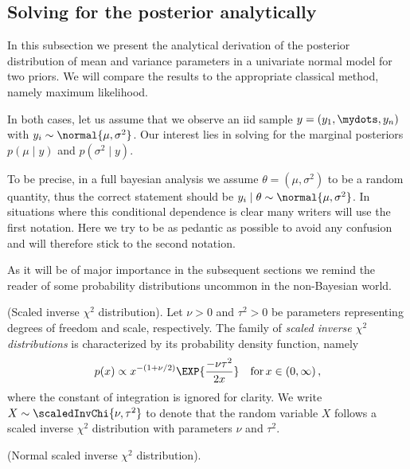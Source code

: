 \subsection{Solving for the posterior analytically}
In this subsection we present the analytical derivation of the posterior distribution of mean and variance parameters in a univariate normal model for two priors.
We will compare the results to the appropriate classical method, namely maximum likelihood.

In both cases, let us assume that we observe an iid sample $y = (y_1, \mydots, y_n)$
with $y_i \sim \normal{\mu, \sigma^2}$.
Our interest lies in solving for the marginal posteriors $p(\mu \mid y)$ and $p(\sigma^2 \mid y)$.

To be precise, in a full bayesian analysis we assume $\theta = (\mu, \sigma^2)$ to be a random quantity, thus the correct statement should be $y_i \mid \theta \sim \normal{\mu, \sigma^2}$.
In situations where this conditional dependence is clear many writers will use the first notation.
Here we try to be as pedantic as possible to avoid any confusion and will therefore stick to the second notation.

As it will be of major importance in the subsequent sections we remind the reader of some probability distributions uncommon in the non-Bayesian world.

\begin{definition}{(Scaled inverse $\chi^2$ distribution).}
  Let $\nu > 0$ and $\tau^2 > 0$ be parameters representing degrees of freedom and scale, respectively. The family of \emph{scaled inverse $\chi^2$ distributions} is characterized by its probability density function, namely
  \begin{align}
    p(x) \propto x^{-(1 + \nu / 2)} \EXP{\frac{-\nu \tau^2}{2 x}} \quad \text{for} \, x \in (0, \infty) \,,
  \end{align}
  where the constant of integration is ignored for clarity.
  We write $X \sim \scaledInvChi{\nu, \tau^2}$ to denote that the random variable $X$ follows a scaled inverse $\chi^2$ distribution with parameters $\nu$ and $\tau^2$.
\end{definition}

\begin{definition}{(Normal scaled inverse $\chi^2$ distribution).}
\end{definition}

